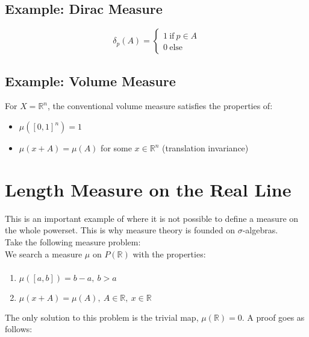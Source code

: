 \subsection{Example: Dirac Measure}
\begin{equation}
\delta_p(A) = \left\{\begin{array}{l} 1 \mathrm{\ if\ }p\in A\\ 0 \mathrm{\ else} \end{array}\right.
\end{equation}

\subsection{Example: Volume Measure}
For $X=\mathbb{R}^n$, the conventional volume measure satisfies the properties of:

\begin{itemize}
\item $\mu([0,1]^n) = 1$
\item $\mu(x + A) = \mu(A)$ for some $x\in \mathbb{R}^n$ (translation invariance)
\end{itemize}



\section{Length Measure on the Real Line}

This is an important example of where it is not possible to define a measure on the whole powerset. This is why measure theory is founded on $\sigma$-algebras.\\

Take the following measure problem:\\

We search a measure $\mu$ on $P(\mathbb{R})$ with the properties:

\paragraph{}
\begin{enumerate}
\item $\mu([a,b]) = b-a,\ b>a$
\item $\mu(x+A) = \mu(A),\ A\in\mathbb{R},\ x\in\mathbb{R}$	 
\end{enumerate}

The only solution to this problem is the trivial map, $\mu(\mathbb{R}) = 0$. A proof goes as follows:

